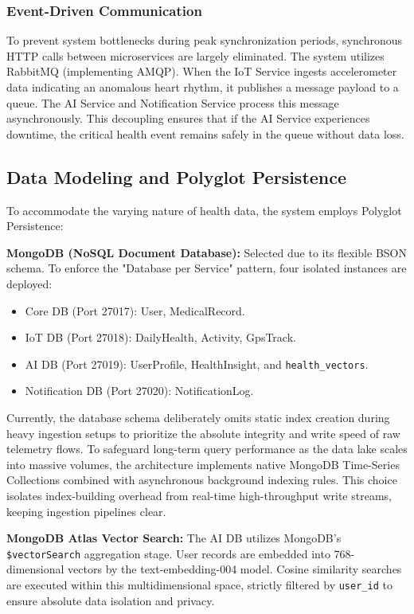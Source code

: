 \documentclass[journal, a4paper]{IEEEtran}
\begin{document}
\subsubsection{Event-Driven Communication}
To prevent system bottlenecks during peak synchronization periods, synchronous HTTP calls between microservices are largely eliminated. The system utilizes RabbitMQ (implementing AMQP). When the IoT Service ingests accelerometer data indicating an anomalous heart rhythm, it publishes a message payload to a queue. The AI Service and Notification Service process this message asynchronously. This decoupling ensures that if the AI Service experiences downtime, the critical health event remains safely in the queue without data loss.

\subsection{Data Modeling and Polyglot Persistence}
To accommodate the varying nature of health data, the system employs Polyglot Persistence:

\textbf{MongoDB (NoSQL Document Database):} Selected due to its flexible BSON schema. To enforce the "Database per Service" pattern, four isolated instances are deployed:
\begin{itemize}
    \item Core DB (Port 27017): User, MedicalRecord.
    \item IoT DB (Port 27018): DailyHealth, Activity, GpsTrack.
    \item AI DB (Port 27019): UserProfile, HealthInsight, and \texttt{health\_vectors}.
    \item Notification DB (Port 27020): NotificationLog.
\end{itemize}
Currently, the database schema deliberately omits static index creation during heavy ingestion setups to prioritize the absolute integrity and write speed of raw telemetry flows. To safeguard long-term query performance as the data lake scales into massive volumes, the architecture implements native MongoDB Time-Series Collections combined with asynchronous background indexing rules. This choice isolates index-building overhead from real-time high-throughput write streams, keeping ingestion pipelines clear.

\textbf{MongoDB Atlas Vector Search:} The AI DB utilizes MongoDB's \texttt{\$vectorSearch} aggregation stage. User records are embedded into 768-dimensional vectors by the text-embedding-004 model. Cosine similarity searches are executed within this multidimensional space, strictly filtered by \texttt{user\_id} to ensure absolute data isolation and privacy.
\end{document}
